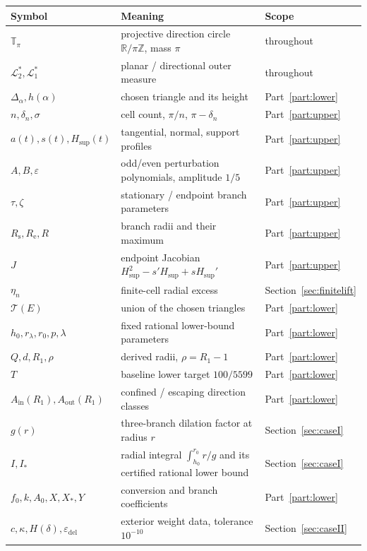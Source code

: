 \documentclass[11pt]{article}
\theoremstyle{plain}
\theoremstyle{definition}
\theoremstyle{remark}
\newcommand{\R}{\mathbb{R}}
\newcommand{\Z}{\mathbb{Z}}
\newcommand{\Tp}{\mathbb{T}_{\pi}}
\newcommand{\Lout}{\mathcal{L}^{*}_{2}}
\newcommand{\Lone}{\mathcal{L}^{*}_{1}}
\newcommand{\Rsta}{R_{\mathrm{s}}}
\newcommand{\Rend}{R_{\mathrm{e}}}
\newcommand{\Ain}{A_{\mathrm{in}}}
\newcommand{\Aout}{A_{\mathrm{out}}}
\newcommand{\Istar}{I_{*}}
\newcommand{\Hsup}{H_{\mathrm{sup}}}
\newcommand{\epsdel}{\varepsilon_{\mathrm{del}}}
\newcommand{\Tri}{\mathcal{T}}
\begin{document}
\begin{table}[t]
\centering
\small
\begin{tabular}{@{}lll@{}}
\toprule
Symbol & Meaning & Scope \\
\midrule
$\Tp$ & projective direction circle $\R/\pi\Z$, mass $\pi$ & throughout\\
$\Lout,\Lone$ & planar / directional outer measure & throughout\\
$\Delta_{\alpha},h(\alpha)$ & chosen triangle and its height
  & Part~\ref{part:lower}\\[2pt]
$n,\delta_{n},\sigma$ & cell count, $\pi/n$, $\pi-\delta_{n}$
  & Part~\ref{part:upper}\\
$a(t),s(t),\Hsup(t)$ & tangential, normal, support profiles
  & Part~\ref{part:upper}\\
$A,B,\varepsilon$ & odd/even perturbation polynomials, amplitude $1/5$
  & Part~\ref{part:upper}\\
$\tau,\zeta$ & stationary / endpoint branch parameters & Part~\ref{part:upper}\\
$\Rsta,\Rend,R$ & branch radii and their maximum & Part~\ref{part:upper}\\
$J$ & endpoint Jacobian $\Hsup^{2}-s'\Hsup+s\Hsup'$
  & Part~\ref{part:upper}\\
$\eta_{n}$ & finite-cell radial excess & Section~\ref{sec:finitelift}\\[2pt]
$\Tri(E)$ & union of the chosen triangles & Part~\ref{part:lower}\\
$h_{0},r_{\lambda},r_{0},p,\lambda$ & fixed rational lower-bound parameters
  & Part~\ref{part:lower}\\
$Q,d,R_{1},\rho$ & derived radii, $\rho=R_{1}-1$ & Part~\ref{part:lower}\\
$T$ & baseline lower target $100/5599$ & Part~\ref{part:lower}\\
$\Ain(R_{1}),\Aout(R_{1})$ & confined / escaping direction classes
  & Part~\ref{part:lower}\\
$g(r)$ & three-branch dilation factor at radius $r$ & Section~\ref{sec:caseI}\\
$I,\Istar$ & radial integral $\int_{h_{0}}^{r_{0}}r/g$ and its certified
  rational lower bound & Section~\ref{sec:caseI}\\
$f_{0},k,A_{0},X,X_{*},Y$ & conversion and branch coefficients
  & Part~\ref{part:lower}\\
$c,\kappa,H(\delta),\epsdel$ & exterior weight data, tolerance $10^{-10}$
  & Section~\ref{sec:caseII}\\[2pt]

\end{tabular}
\end{table}
\end{document}
